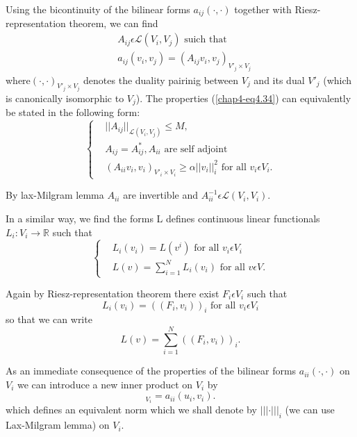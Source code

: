 Using the bicontinuity of the bilinear forms $a_{ij}( \cdot , \cdot )$ together with Riesz-representation theorem, we can find
\begin{align*}
& A_{ij} \epsilon \mathscr{L} (V_{i}, V_{j}) \text{ suich that}\\
& a_{ij} (v_{i}, v_{j}) = (A_{ij} v_{i}, v_{j})_{V'_{j} \times V_{j}}\tag{4.35}\label{chap4-eq4.35}
\end{align*}
where\pageoriginale $(\cdot , \cdot)_{V'_{j} \times V_{j}}$ denotes the duality pairinig between $V_{j}$ and its dual $V'_{j}$ (which is canonically isomorphic to $V_{j}$). The properties (\ref{chap4-eq4.34}) can equivalently be stated in the following form:
\begin{equation*}
\begin{cases}
& ||A_{ij}||_{\mathscr{L}(V_{i}, V_{j})} \leq M,\\
& A_{ij} = A_{ij}^{*} , A_{ii} \text{ are self adjoint}\\
& (A_{ii} v_{i}, v_{i})_{V'_{i} \times V_{i}} \geq \alpha||v_{i}||_{i}^{2} \text{ for all } v_{i} \epsilon V_{i}.\tag*{$(4.34)'$}\label{chap4-eq4.34'}
\end{cases}
\end{equation*}

By lax-Milgram lemma $A_{ii}$ are invertible and $A_{ii}^{-1} \epsilon \mathscr{L} (V_{i}, V_{i})$.

In a similar way, we find the forms L defines continuous linear functionals $L_{i} : V_{i} \to \mathbb{R}$ such that
\begin{equation*}
\begin{cases}
& L_{i}(v_{i}) = L(v^{i}) \text{ for all } v_{i} \epsilon V_{i}\\
& L(v) = \sum_{i=1}^{N} L_{i} (v_{i}) \text{ for all } v \epsilon V.
\end{cases}
\end{equation*}

Again by Riesz-representation theorem there exist $F_{i} \epsilon V_{i}$ such that
$$
L_{i} (v_{i}) = ((F_{i}, v_{i}))_{i} \text{ for all } v_{i} \epsilon V_{i}
$$
so that we can write
\begin{equation*}
L(v) = \sum_{i=1}^{N} ((F_{i}, v_{i}))_{i}.\tag{4.36}\label{chap4-eq4.36}
\end{equation*}

As an immediate consequence of the properties of the bilinear forms $a_{ii}(\cdot , \cdot)$ on $V_{i}$ we can introduce a new inner product on $V_{i}$ by
\begin{equation*}
[u_{i}, v_{i}]_{V_{i}} = a_{ii} (u_{i}, v_{i}).\tag{4.37}\label{chap4-eq4.37}
\end{equation*}
which defines an equivalent norm which we shall denote by $||| \cdot |||_{i}$ (we can use Lax-Milgram lemma) on $V_{i}$.

